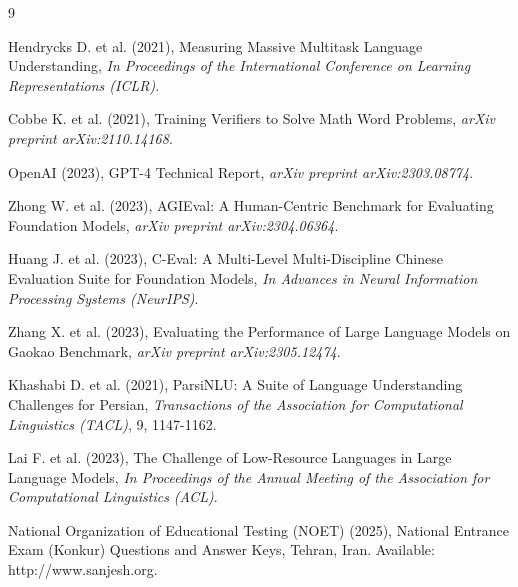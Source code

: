 \documentclass[twoside]{article}
\begin{document}
\begin{thebibliography}{9}
\setlength{\itemsep}{0pt} %
\setlength{\parskip}{0pt}

Hendrycks D. et al. (2021), Measuring Massive Multitask Language Understanding, {\it In Proceedings of the International Conference on Learning Representations (ICLR)}.

Cobbe K. et al. (2021), Training Verifiers to Solve Math Word Problems, {\it arXiv preprint arXiv:2110.14168}.

OpenAI (2023), GPT-4 Technical Report, {\it arXiv preprint arXiv:2303.08774}.

Zhong W. et al. (2023), AGIEval: A Human-Centric Benchmark for Evaluating Foundation Models, {\it arXiv preprint arXiv:2304.06364}.

Huang J. et al. (2023), C-Eval: A Multi-Level Multi-Discipline Chinese Evaluation Suite for Foundation Models, {\it In Advances in Neural Information Processing Systems (NeurIPS)}.

Zhang X. et al. (2023), Evaluating the Performance of Large Language Models on Gaokao Benchmark, {\it arXiv preprint arXiv:2305.12474}.

Khashabi D. et al. (2021), ParsiNLU: A Suite of Language Understanding Challenges for Persian, {\it Transactions of the Association for Computational Linguistics (TACL)}, 9, 1147-1162.

Lai F. et al. (2023), The Challenge of Low-Resource Languages in Large Language Models, {\it In Proceedings of the Annual Meeting of the Association for Computational Linguistics (ACL)}.

National Organization of Educational Testing (NOET) (2025), National Entrance Exam (Konkur) Questions and Answer Keys, Tehran, Iran. Available: http://www.sanjesh.org.

\end{thebibliography}
\end{document}
